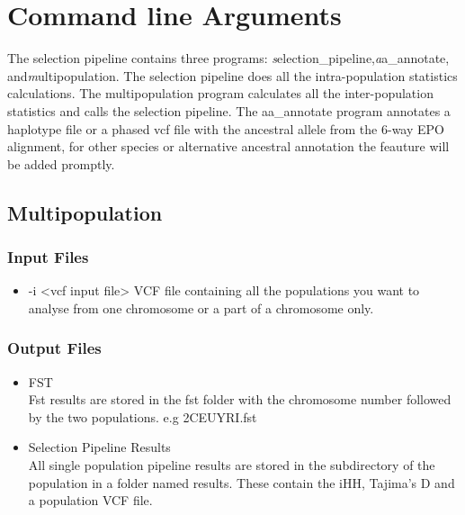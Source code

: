 \documentclass[a4paper,10pt]{article}
\begin{document}
\section{Command line Arguments}
The selection pipeline contains three programs: \emph selection\_pipeline,\emph aa\_annotate, and\emph multipopulation. The selection pipeline does all the intra-population statistics calculations. The multipopulation program calculates all the inter-population statistics and calls the selection pipeline. The aa\_annotate program annotates a haplotype file or a phased vcf file with the ancestral allele from the 6-way EPO alignment, for other species or alternative ancestral annotation the feauture will be added promptly.
\subsection{Multipopulation}
\subsubsection{Input Files}
\begin{itemize}
\item -i <vcf input file>
VCF file containing all the populations you want to analyse from one chromosome or a part of a chromosome only. 
\end{itemize}
\subsubsection{Output Files}
\begin{itemize}
\item FST \\
Fst results are stored in the fst folder with the chromosome number followed by the two populations. e.g 2CEUYRI.fst
\item Selection Pipeline Results\\
All single population pipeline results are stored in the subdirectory of the population in a folder named results. These contain the iHH, Tajima's D and a population VCF file.
\end{itemize}
\end{document}

